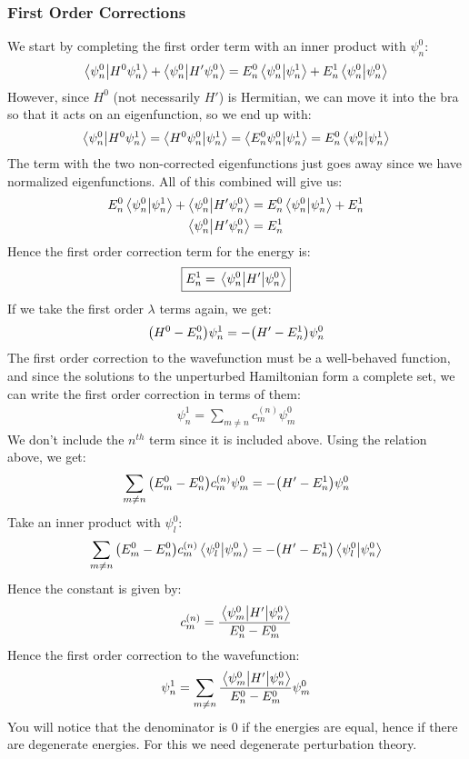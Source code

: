 \subsubsection{First Order Corrections}
We start by completing the first order term with an inner product with $\psi_n^0$:
\begin{align*}
  \ip{\psi_n^0}{H^0\psi_n^1}+\ip{\psi_n^0}{H'\psi_n^0}=
  E_n^0\ip{\psi_n^0}{\psi_n^1}+E_n^1\ip{\psi_n^0}{\psi_n^0}
\end{align*}
However, since $H^0$ (not necessarily $H'$) is Hermitian, we can move it into the bra so that it acts on an eigenfunction, so we end up with:
\begin{align*}
  \ip{\psi_n^0}{H^0\psi_n^1}=\ip{H^0\psi_n^0}{\psi_n^1}=\ip{E_n^0\psi_n^0}{\psi_n^1}=
  E_n^0\ip{\psi_n^0}{\psi_n^1}
\end{align*}
The term with the two non-corrected eigenfunctions just goes away since we have normalized eigenfunctions. All of this combined will give us:
\begin{align*}
  E_n^0\ip{\psi_n^0}{\psi_n^1}+\ip{\psi_n^0}{H'\psi_n^0}&=
  E_n^0\ip{\psi_n^0}{\psi_n^1}+E_n^1\\
  \ip{\psi_n^0}{H'\psi_n^0}&=E_n^1
\end{align*}
Hence the first order correction term for the energy is:
\begin{align*}
  \boxed{E_n^1=\mel{\psi_n^0}{H'}{\psi_n^0}}
\end{align*}
If we take the first order $\lambda$ terms again, we get:
\begin{align*}
  \qty(H^0-E_n^0)\psi_n^1=-\qty(H'-E_n^1)\psi_n^0
\end{align*}
The first order correction to the wavefunction must be a well-behaved function, and since the solutions to the unperturbed Hamiltonian form a complete set, we can write the first order correction in terms of them:
\begin{align*}
  \psi_n^1=\sum_{m\neq n}c_m^{(n)}\psi_m^0
\end{align*}
We don't include the $n^{th}$ term since it is included above. Using the relation above, we get:
\begin{align*}
  \sum_{m\neq n}\qty(E_m^0-E_n^0)c_m^{(n)}\psi_m^0=-\qty(H'-E_n^1)\psi_n^0
\end{align*}
Take an inner product with $\psi_l^0$:
\begin{align*}
  \sum_{m\neq n}\qty(E_m^0-E_n^0)c_m^{(n)}\ip{\psi_l^0}{\psi_m^0}=
  -\qty(H'-E_n^1)\ip{\psi_l^0}{\psi_n^0}
\end{align*}
Hence the constant is given by:
\begin{align*}
  c_m^{(n)}=\frac{\mel{\psi_m^0}{H'}{\psi_n^0}}{E_n^0-E_m^0}
\end{align*}
Hence the first order correction to the wavefunction:
\begin{align*}
  \psi_n^1=\sum_{m\neq n}\frac{\mel{\psi_m^0}{H'}{\psi_n^0}}{E_n^0-E_m^0}\psi_m^0
\end{align*}
You will notice that the denominator is $0$ if the energies are equal, hence if there are degenerate energies. For this we need degenerate perturbation theory.
